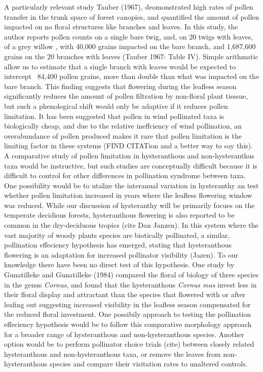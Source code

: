 \documentclass{article}\usepackage[]{graphicx}\usepackage[]{color}
\begin{document}
A particularly relevant study Tauber (1967), deomonstrated high rates of pollen transfer in the trunk space of forest canopies, and quantified the amount of pollen impacted on no floral structures like branches and leaves. In this study, the author reports pollen counts on a single bare twig, and, on 20 twigs with leaves, of a grey willow , with 40,000 grains impacted on the bare branch, and 1,687,600 grains on the 20 branches with leaves (Tauber 1967: Table IV). Simple arithmatic allow us to estimate that a single branch with leaves would be expected to intercept ~84,400 pollen grains, more than double than what was impacted on the bare branch. This finding suggests that flowering during the leafless season significantly reduces the amount of pollen filtration by non-floral plant tisssue, but such a phenological shift would only be adaptive if it reduces pollen limitation. It has been suggested that pollen in wind pollinated taxa is biologically cheap, and due to the relative ineffciency of wind pollination, an overabundance of pollen produced makes it rare that pollen limitation is the limiting factor in these systems (FIND CITATion and a better way to say this). A comparative study of pollen limitation in hysteranthous and non-hysteranthus taxa would be instructive, but such studies are conceptually difficult because it is difficult to control for other differences in pollination syndrome between taxa. One possibility would be to utalize the interanual variation in hysteranthy an test whether pollen limitation increased in years where the leafless flowering window was reduced.
While our discussion of hysteranthy will be primarily focues on the temperate decidious forests, hysteranthous flowering is also reported to be common in the dry-deciduous tropics (cite Dan Janzen). In this system where the vast majority of woody plants species are biotically pollinated, a similar, pollination effeciency hypothesis has emerged, stating that hysteranthous flowering is an adaptation for increased pollinator visibility (Jazen). To our knowledge there have been no direct test of this hypothesis. One study by Gunatilleke and Gunatilleke (1984) compared the floral of biology of three species in the genus \textit{Cornus}, and found that the hysteranthous \textit{Cornus mas} invest less in their floral display and attractant than the species that flowered with or after leafing out suggesting increased visibility in the leafless season compensated for the reduced floral investment. One possibily approach to testing the pollination effeciency hypothesis would be to follow this comparative morphology approach for a broader range of hysteranthous and non-hysteranthous species. Another option would be to perform pollinator choice trials (cite) between closely related hysteranthous and non-hysteranthous taxa, or remove the leaves from non-hysteranthous species and compare their visitation rates to unaltered controls.
\end{document}
